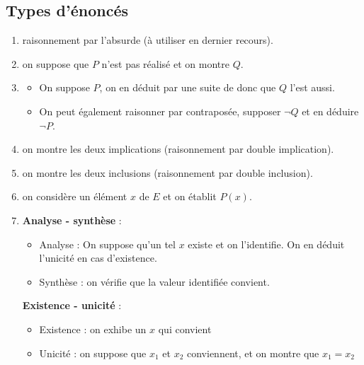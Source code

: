 \subsection{Types d'énoncés}

\begin{enumerate}
	\item{}
    raisonnement par l'absurde (à utiliser en dernier recours).

    \item{}
    on suppose que $P$ n'est pas réalisé et on montre $Q$.

    \item{}
    \begin{itemize}
        \item On suppose $P$, on en déduit par une suite de donc que $Q$ l'est aussi.
        \item On peut également raisonner par contraposée, supposer $\neg Q$ et en déduire $\neg P$.
    \end{itemize}

    \item{}
    on montre les deux implications (raisonnement par double implication).

    \item{}
    on montre les deux inclusions (raisonnement par double inclusion).

    \item{}
    on considère un élément $x$ de $E$ et on établit $P(x)$.

    \item{}

    \textbf{Analyse - synthèse} :
    \begin{itemize}
        \item Analyse : On suppose qu'un tel $x$ existe et on l'identifie. On en 
        déduit l'unicité en cas d'existence. 
        \item Synthèse : on vérifie que la valeur identifiée convient. 
    \end{itemize}

    \textbf{Existence - unicité} :
    \begin{itemize}
        \item Existence : on exhibe un $x$ qui convient
        \item Unicité : on suppose que $x_1$ et $x_2$ conviennent, et on montre que 
        $x_1 = x_2$
    \end{itemize}


\end{enumerate}
